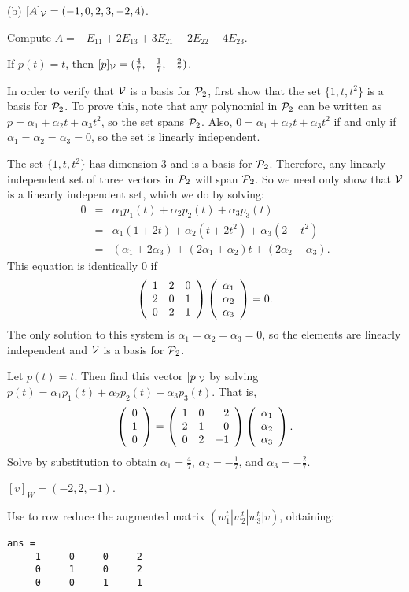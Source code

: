 (b) \ans $[A]_{\cal V} = (-1,0,2,3,-2,4)$.

\soln Compute $A = -E_{11} + 2E_{13} + 3E_{21} - 2E_{22} + 4E_{23}$.

\ans If $p(t) = t$, then
$[p]_{\cal V} = (\frac{4}{7}, -\frac{1}{7}, -\frac{2}{7})$.

\soln In order to verify that ${\cal V}$ is a basis for ${\cal P}_2$, first
show that the set $\{1,t,t^2\}$ is a basis for ${\cal P}_2$.  To prove
this, note that any polynomial in ${\cal P}_2$ can be written as
$p = \alpha_1 + \alpha_2t + \alpha_3t^2$, so the set spans ${\cal P}_2$.
Also, $0 = \alpha_1 + \alpha_2t + \alpha_3t^2$ if and only if
$\alpha_1 = \alpha_2 = \alpha_3 = 0$, so the set is linearly
independent.

\para The set $\{1,t,t^2\}$ has dimension 3 and is a basis for
${\cal P}_2$.  Therefore, any linearly independent set of three vectors
in ${\cal P}_2$ will span ${\cal P}_2$.  So we need only show that
${\cal V}$ is a linearly independent set, which we do by solving:
\[
\begin{array}{rcl}
0 & = & \alpha_1p_1(t) + \alpha_2p_2(t) + \alpha_3p_3(t) \\
& = & \alpha_1(1 + 2t) + \alpha_2(t + 2t^2) + \alpha_3(2 - t^2) \\
& = & (\alpha_1 + 2\alpha_3) + (2\alpha_1 + \alpha_2)t +
(2\alpha_2 - \alpha_3). \end{array}
\]
This equation is identically $0$ if
\[
\left(\begin{array}{rrr} 1 & 2 & 0 \\ 2 & 0 & 1 \\ 0 & 2 & 1\end{array}\right)\left(\begin{array}{r} \alpha_1 \\ \alpha_2 \\ \alpha_3\end{array}\right) = 0.
\]
The only solution to this system is $\alpha_1 = \alpha_2 = \alpha_3
 = 0$, so the elements are linearly independent and ${\cal V}$ is
a basis for ${\cal P}_2$.

\para Let $p(t) = t$.  Then find this vector $[p]_{\cal V}$ by solving
$p(t) = \alpha_1p_1(t) + \alpha_2p_2(t) + \alpha_3p_3(t)$. 
That is,
\[ \left(\begin{array}{r} 0 \\ 1 \\ 0\end{array}\right) = \left(\begin{array}{rrr} 1 & 0 & 2 \\ 2 & 1 & 0 \\ 0 & 2 & -1\end{array}\right)
\left(\begin{array}{r} \alpha_1 \\ \alpha_2 \\ \alpha_3\end{array}\right). \]
Solve by substitution to obtain $\alpha_1 = \frac{4}{7}$, $\alpha_2
= -\frac{1}{7}$, and $\alpha_3 = -\frac{2}{7}$.

\ans $[v]_W = (-2,2,-1)$.

\soln Use \Matlab to row reduce the augmented matrix
$(w_1^t|w_2^t|w_3^t|v)$, obtaining:
\begin{verbatim}
ans = 
     1     0     0    -2
     0     1     0     2
     0     0     1    -1
\end{verbatim}

